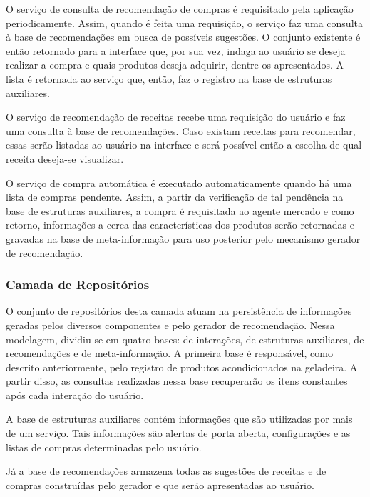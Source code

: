 O serviço de consulta de recomendação de compras é requisitado pela aplicação periodicamente. Assim, quando é feita uma requisição, o serviço faz uma consulta à base de recomendações em busca de possíveis sugestões. O conjunto existente é então retornado para a interface que, por sua vez, indaga ao usuário se deseja realizar a compra e quais produtos deseja adquirir, dentre os apresentados. A lista é retornada ao serviço que, então, faz o registro na base de estruturas auxiliares.


O serviço de recomendação de receitas recebe uma requisição do usuário e faz uma consulta à base de recomendações. Caso existam receitas para recomendar, essas serão listadas ao usuário na interface e será possível então a escolha de qual receita deseja-se visualizar.


O serviço de compra automática é executado automaticamente quando há uma lista de compras pendente. Assim, a partir da verificação de tal pendência na base de estruturas auxiliares, a compra é requisitada ao agente mercado e como retorno, informações a cerca das características dos produtos serão retornadas e gravadas na base de meta-informação para uso posterior pelo mecanismo gerador de recomendação. 

\subsubsection{Camada de Repositórios}

O conjunto de repositórios desta camada atuam na persistência de informações geradas pelos diversos componentes e pelo gerador de recomendação. Nessa modelagem, dividiu-se em quatro bases: de interações, de estruturas auxiliares, de recomendações e de meta-informação.
A primeira base é responsável, como descrito anteriormente, pelo registro de produtos acondicionados na geladeira. A partir disso, as consultas realizadas nessa base recuperarão os itens constantes após cada interação do usuário.

A base de estruturas auxiliares contém informações que são utilizadas por mais de um serviço. Tais informações são alertas de porta aberta, configurações e as listas de compras determinadas pelo usuário. 

Já a base de recomendações armazena todas as sugestões de receitas e de compras construídas pelo gerador e que serão apresentadas ao usuário.

